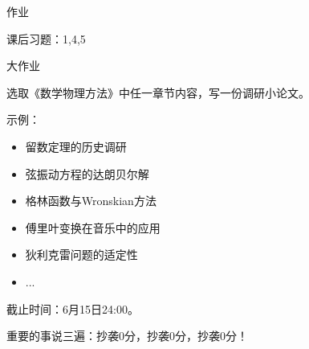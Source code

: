 \documentclass[11pt]{beamer}
\newcommand{\kong}[1][0.5]{\vspace{#1cm}}
\begin{document}
\begin{frame}{作业}


\kong[0.5]
课后习题：1,4,5

\kong[1]
\end{frame}


\begin{frame}{大作业}

\kong[0.5]
选取《数学物理方法》中任一章节内容，写一份调研小论文。

\kong[0.5]
示例：
\begin{itemize}
\item 留数定理的历史调研
\item 弦振动方程的达朗贝尔解
\item 格林函数与Wronskian方法
\item 傅里叶变换在音乐中的应用
\item 狄利克雷问题的适定性
\item ...
\end{itemize}

截止时间：6月15日24:00。

\kong[0.5]

重要的事说三遍：抄袭0分，抄袭0分，抄袭0分！

\end{frame}
\end{document}
